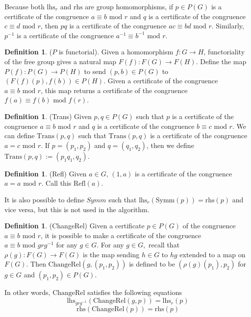 \documentclass[12pt]{article} %
\theoremstyle{definition}
\theoremstyle{definition}
\theoremstyle{definition}
\theoremstyle{definition}
\newtheorem{defn}[thm]{Definition}
\begin{document}
Because both $\text{lhs}_r$ and $\text{rhs}$ are group homomorphisms, if $p \in P(G)$ is a certificate
of the congruence $a \equiv b \text{ mod } r$ and $q$ is a certificate of the congruence
$c \equiv d \text{ mod } r$, then $pq$ is a certificate of the congruence $ac \equiv bd \text{ mod } r$.
Similarly, $p^{-1}$ is a certificate of the congruence $a^{-1} \equiv b^{-1} \text{ mod } r$.

\begin{defn}($P$ is functorial).
  Given a homomorphism $f: G \to H$,
  functoriality of the free group gives a natural map $F(f): F(G) \to F(H)$.
  Define the map $P(f): P(G) \to P(H)$ to send $(p, b) \in P(G)$ to $(F(f)(p), f(b)) \in P(H)$.
  Given a certificate of the congruence $a \equiv b \text{ mod } r$, this map returns
  a certificate of the congruence $f(a) \equiv f(b) \text{ mod } f(r)$.
\end{defn}

\begin{defn}(Trans)
  Given $p,q \in P(G)$ such that $p$ is a certificate of the congruence $a \equiv b \text{ mod } r$
  and $q$ is a certificate of the congruence $b \equiv c \text{ mod } r$. We can define
  $\text{Trans}(p,q)$ such that $\text{Trans}(p,q)$ is a certificate of the congruence
  $a = c \text{ mod } r$.
  If $p = (p_1, p_2)$ and $q = (q_1, q_2)$, then we define $\text{Trans}(p,q) := (p_1q_1, q_2)$.
\end{defn}

\begin{defn}(Refl)
  Given $a \in G$, $(1, a)$ is a certificate of the congruence $a = a \text{ mod } r$. Call
  this $\text{Refl}(a)$.
\end{defn}

It is also possible to define $\textit{Symm}$ such that $\text{lhs}_r(\text{Symm}(p)) = \text{rhs}(p)$
and vice versa, but this is not used in the algorithm.

\begin{defn}(ChangeRel)
  Given a certificate $p \in P(G)$ of the congruence $a \equiv b \text{ mod } r$, it is possible
  to make a certificate of the congruence $a \equiv b \text{ mod } g r g^{-1}$ for any $g \in G$.
  For any $g \in G,$ recall that $\rho(g): F(G) \to F(G)$ is the map sending $h \in G$ to
  $hg$ extended to a map on $F(G)$.
  Then $\text{ChangeRel}(g,(p_1,p_2))$ is defined to be $(\rho(g)(p_1), p_2)$ for
  $g \in G$ and $(p_1, p_2) \in P(G)$.

  In other words, $\text{ChangeRel}$ satisfies the following equations
  \begin{equation}
    \text{lhs}_{grg^{-1}}\left(\text{ChangeRel}(g, p)\right) = \text{lhs}_r(p)
  \end{equation}
  \begin{equation}
    \text{rhs}(\text{ChangeRel}(p)) = \text{rhs}(p)
  \end{equation}
\end{defn}
\end{document}
